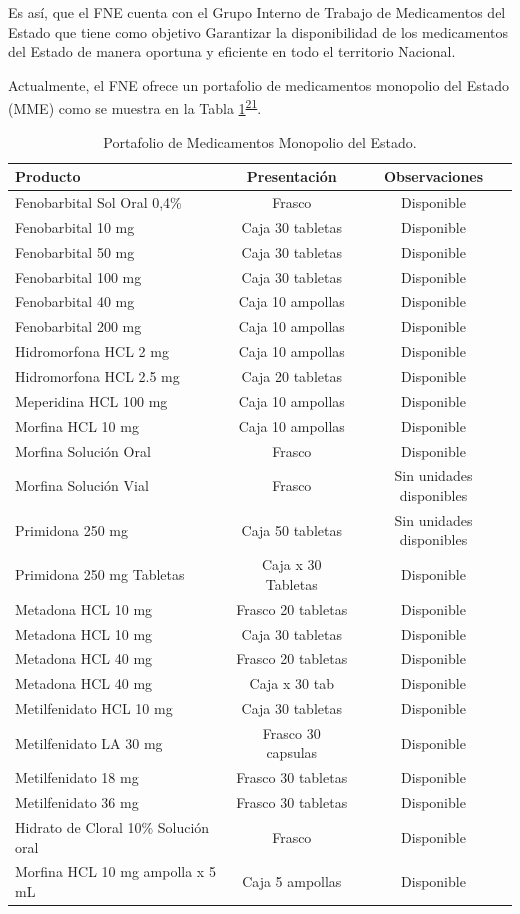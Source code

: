 \documentclass[
]{book}
\begin{document}
Es así, que el FNE cuenta con el Grupo Interno de Trabajo de Medicamentos del Estado que tiene como objetivo Garantizar la disponibilidad de los medicamentos del Estado de manera oportuna y eficiente en todo el territorio Nacional.

Actualmente, el FNE ofrece un portafolio de medicamentos monopolio del Estado (MME) como se muestra en la Tabla \ref{tab:portafolioMME}\textsuperscript{\protect\hyperlink{ref-ColombiaCompraEficiente2021}{21}}.

\begin{table}[!h]

\caption{\label{tab:portafolioMME}Portafolio de Medicamentos Monopolio del Estado.}
\centering
\begin{tabular}[t!]{lcc}
\toprule
Producto & Presentación & Observaciones\\
\midrule
Fenobarbital Sol Oral 0,4\% & Frasco & Disponible\\
Fenobarbital 10 mg & Caja 30 tabletas & Disponible\\
Fenobarbital 50 mg & Caja 30 tabletas & Disponible\\
Fenobarbital 100 mg & Caja 30 tabletas & Disponible\\
Fenobarbital 40 mg & Caja 10 ampollas & Disponible\\
\addlinespace
Fenobarbital 200 mg & Caja 10 ampollas & Disponible\\
Hidromorfona HCL 2 mg & Caja 10 ampollas & Disponible\\
Hidromorfona HCL 2.5 mg & Caja 20 tabletas & Disponible\\
Meperidina HCL 100 mg & Caja 10 ampollas & Disponible\\
Morfina HCL 10 mg & Caja 10 ampollas & Disponible\\
\addlinespace
Morfina Solución Oral & Frasco & Disponible\\
Morfina Solución Vial & Frasco & Sin unidades disponibles\\
Primidona 250 mg & Caja 50 tabletas & Sin unidades disponibles\\
Primidona 250 mg Tabletas & Caja x 30 Tabletas & Disponible\\
Metadona HCL 10 mg & Frasco 20 tabletas & Disponible\\
\addlinespace
Metadona HCL 10 mg & Caja 30 tabletas & Disponible\\
Metadona HCL 40 mg & Frasco 20 tabletas & Disponible\\
Metadona HCL 40 mg & Caja x 30 tab & Disponible\\
Metilfenidato HCL 10 mg & Caja 30 tabletas & Disponible\\
Metilfenidato LA 30 mg & Frasco 30 capsulas & Disponible\\
\addlinespace
Metilfenidato 18 mg & Frasco 30 tabletas & Disponible\\
Metilfenidato 36 mg & Frasco 30 tabletas & Disponible\\
Hidrato de Cloral 10\% Solución oral & Frasco & Disponible\\
Morfina HCL 10 mg ampolla x 5 mL & Caja 5 ampollas & Disponible\\
\bottomrule
\end{tabular}
\end{table}
\end{document}
